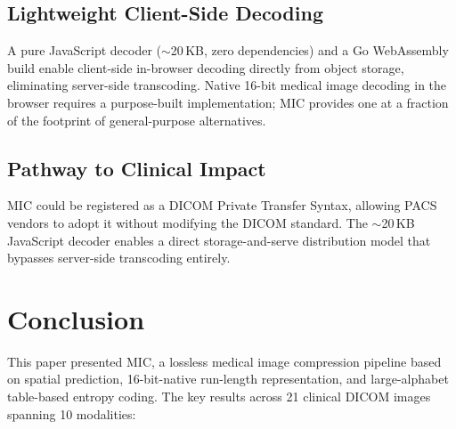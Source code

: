 \documentclass[journal]{IEEEtran}
\begin{document}
\subsection{Lightweight Client-Side Decoding}

A pure JavaScript decoder (${\sim}$20\,KB, zero dependencies) and a Go
WebAssembly build enable client-side in-browser decoding directly from object
storage, eliminating server-side transcoding. Native 16-bit medical image
decoding in the browser requires a purpose-built implementation; MIC provides
one at a fraction of the footprint of general-purpose alternatives.

\subsection{Pathway to Clinical Impact}

MIC could be registered as a DICOM Private Transfer Syntax, allowing PACS
vendors to adopt it without modifying the DICOM standard. The ${\sim}$20\,KB
JavaScript decoder enables a direct storage-and-serve distribution model that
bypasses server-side transcoding entirely.

\section{Conclusion}
\label{sec:conclusion}

This paper presented MIC, a lossless medical image compression pipeline based on
spatial prediction, 16-bit-native run-length representation, and large-alphabet
table-based entropy coding. The key results across 21 clinical DICOM images
spanning 10 modalities:
\end{document}
